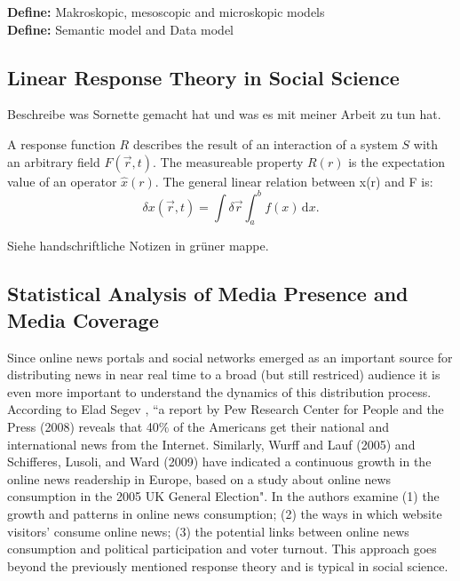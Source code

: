\documentclass[a4paper,10pt]{scrbook}
\begin{document}
\textbf{Define:} Makroskopic, mesoscopic and microskopic models\\
 
\textbf{Define:} Semantic model and Data model 
 
\subsection{Linear Response Theory in Social Science}
\label{sec.linresponse}
\label{fig.LIN.RES.THEORY}

Beschreibe was Sornette gemacht hat und was es mit meiner Arbeit zu tun hat.


A response function $R$ describes the result of an interaction of a system $S$ with an arbitrary field $F(\vec{r}, t)$. The measureable property $R(r)$ is the expectation
value of an operator $\hat{x}(r)$. The general linear relation between x(r) and F is:
\begin{equation}
\delta x(\vec{r}, t) = \int \delta \vec{r} \int_a^b \! f(x) \, \mathrm{d}x.
\end{equation}


Siehe handschriftliche Notizen in grüner mappe.

\subsection{Statistical Analysis of Media Presence and Media Coverage}
Since online news portals and social networks emerged as an important source for distributing news in near real time to a broad (but still restriced) audience it is even more important to understand the dynamics of this distribution process. According to Elad Segev \cite{Segev2010}, “a report by Pew Research Center for People and the Press (2008) reveals that 40$\%$ of the Americans get their national and international news from the Internet. Similarly, Wurff and Lauf (2005) \cite{vanDerWurff2007} and Schifferes, Lusoli, and Ward (2009) \cite{Schifferes2009} have indicated a continuous growth in the online news readership in Europe, based on a study about online news consumption in the 2005 UK General Election". In \cite{Schifferes2009} the authors examine (1) the growth and patterns in online news consumption; (2) the ways in which website visitors' consume online news; (3) the potential links between online news consumption and political participation and voter turnout. This approach goes beyond the previously mentioned response theory and is typical in social science.
\end{document}
